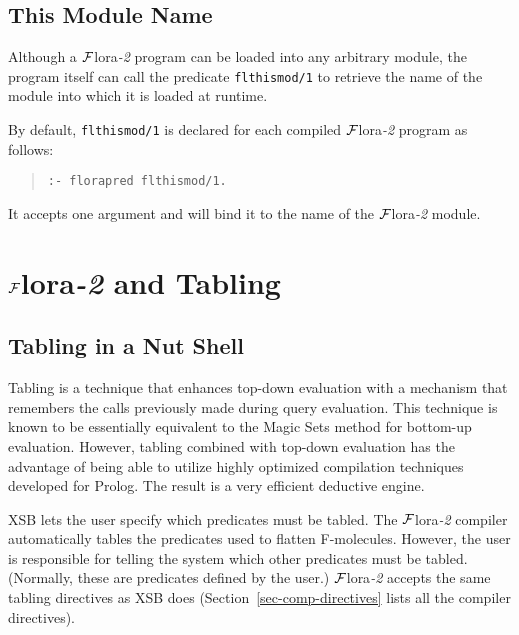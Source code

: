 \documentclass[11pt]{article}
\newcommand{\FLORA}{{\mbox{${\cal F}${\sc lora}\rm\emph{-2}}}\xspace}
\begin{document}
\subsection{This Module Name}


%
Although a \FLORA program can be loaded into any arbitrary module, the
program itself can call the predicate {\tt flthismod/1} to retrieve
the name of the module into which it is loaded at runtime.

By default, {\tt flthismod/1} is declared for each compiled \FLORA program
as follows:
\begin{quote}
\verb|:- florapred flthismod/1.|
\end{quote}
It accepts one argument and will bind it to the name of the \FLORA
module.


\section{\FLORA and Tabling}\label{sec-tabling-flora}


\subsection{Tabling in a Nut Shell}


%
Tabling is a technique that enhances top-down evaluation with a mechanism
that remembers the calls previously made during query evaluation.
This technique is known to be essentially equivalent to the Magic Sets
method for bottom-up evaluation. However, tabling combined with top-down
evaluation has the advantage of being able to utilize highly optimized
compilation techniques developed for Prolog. The result is a very efficient
deductive engine.

XSB lets the user specify which predicates must be tabled.  The \FLORA
compiler automatically tables the predicates used to flatten F-molecules.
However, the user is responsible for telling the system which other
predicates must be tabled. (Normally, these are predicates defined by the
user.)  \FLORA accepts the same tabling directives as XSB does
(Section~\ref{sec-comp-directives} lists all the compiler directives).
\end{document}
